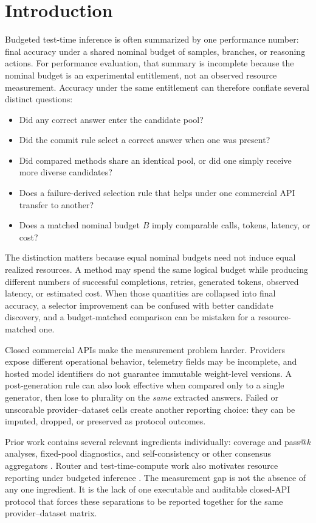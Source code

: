 \section{Introduction}
\label{sec:intro}

Budgeted test-time inference is often summarized by one performance number: final accuracy under a
shared nominal budget of samples, branches, or reasoning actions. For performance evaluation, that
summary is incomplete because the nominal budget is an experimental entitlement, not an observed
resource measurement. Accuracy under the same entitlement can therefore conflate several distinct
questions:
\begin{itemize}
\item Did any correct answer enter the candidate pool?
\item Did the commit rule select a correct answer when one was present?
\item Did compared methods share an identical pool, or did one simply receive more diverse
candidates?
\item Does a failure-derived selection rule that helps under one commercial API transfer to another?
\item Does a matched nominal budget $B$ imply comparable calls, tokens, latency, or cost?
\end{itemize}

The distinction matters because equal nominal budgets need not induce equal realized resources.
A method may spend the same logical budget while producing different numbers of successful
completions, retries, generated tokens, observed latency, or estimated cost. When those quantities
are collapsed into final accuracy, a selector improvement can be confused with better candidate
discovery, and a budget-matched comparison can be mistaken for a resource-matched one.

Closed commercial APIs make the measurement problem harder. Providers expose different operational
behavior, telemetry fields may be incomplete, and hosted model identifiers do not guarantee
immutable weight-level versions. A post-generation rule can also look effective when compared only
to a single generator, then lose to plurality on the \emph{same} extracted answers. Failed or
unscorable provider--dataset cells create another reporting choice: they can be imputed, dropped, or
preserved as protocol outcomes.

Prior work contains several relevant ingredients individually: coverage and pass@$k$ analyses,
fixed-pool diagnostics, and self-consistency or other consensus aggregators
\citep{passatk,ll_monkeys,oracle_gap,selfconsistency}. Router and test-time-compute work also
motivates resource reporting under budgeted inference \citep{snell_ttc}. The measurement gap is not
the absence of any one ingredient. It is the lack of one executable and auditable closed-API
protocol that forces these separations to be reported together for the same provider--dataset
matrix.

